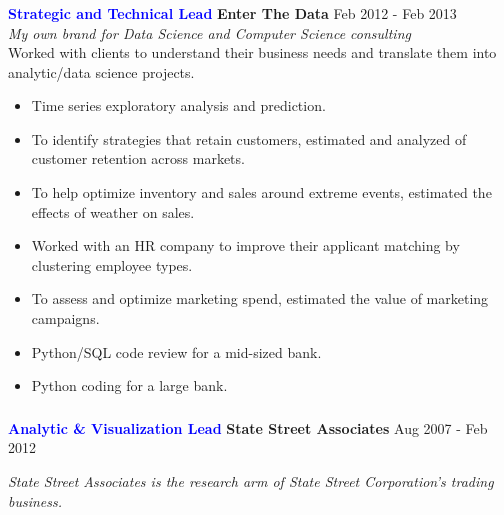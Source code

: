 \documentclass[10pt, letterpaper]{article} %
\providecommand{\tightlist}{%
  \setlength{\itemsep}{0pt}\setlength{\parskip}{0pt}}
\begin{document}
{{\vspace{-15pt}
{\subsubsection{} \label{enterthedata}}
\textbf{\textcolor{blue}  {Strategic and Technical Lead}} \hfill
 \textbf{Enter The Data} \hfill  
 \hfill Feb 2012 - Feb 2013\\
\emph {My own brand for Data Science and Computer Science consulting}\\
Worked with clients to understand their business needs and translate them into analytic/data science projects.
\begin{itemize}
\tightlist
\item  Time series exploratory analysis and prediction.
\item To identify strategies that retain customers, estimated and analyzed of customer retention across markets.
\item To help optimize inventory and sales around extreme events,
estimated the effects of weather on sales.
\item Worked with an HR company to improve their applicant matching by clustering employee types.
\item To assess and optimize marketing spend, estimated the value of marketing campaigns.
\item Python/SQL code review for a mid-sized bank.
\item Python coding for a large bank.
\end{itemize}

\vspace{-18pt}
\hypertarget{ssa}{%
\subsubsection{}\label{ssa}}
 {\textbf {\textcolor{blue} {Analytic \& Visualization Lead}} \hfill
 \textbf{State Street Associates} \hfill  
  Aug 2007 - Feb 2012 

\vspace{-4pt}
{\hspace{0.1in} \footnotesize \emph{State Street Associates is the research arm of State Street Corporation's trading business.}}

\vspace{-8pt}

}}}
\end{document}
